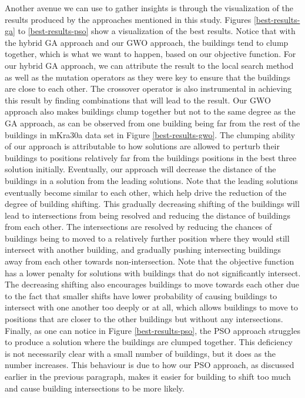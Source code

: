 Another avenue we can use to gather insights is through the visualization of the results produced by the approaches mentioned in this study. Figures \ref{best-results-ga} to \ref{best-results-pso} show a visualization of the best results. Notice that with the hybrid GA approach and our GWO approach, the buildings tend to clump together, which is what we want to happen, based on our objective function. For our hybrid GA approach, we can attribute the result to the local search method as well as the mutation operators as they were key to ensure that the buildings are close to each other. The crossover operator is also instrumental in achieving this result by finding combinations that will lead to the result. Our GWO approach also makes buildings clump together but not to the same degree as the GA approach, as can be observed from one building being far from the rest of the buildings in mKra30a data set in Figure \ref{best-results-gwo}. The clumping ability of our approach is attributable to how solutions are allowed to perturb their buildings to positions relatively far from the buildings positions in the best three solution initially. Eventually, our approach will decrease the distance of the buildings in a solution from the leading solutions. Note that the leading solutions eventually become similar to each other, which help drive the reduction of the degree of building shifting. This gradually decreasing shifting of the buildings will lead to intersections from being resolved and reducing the distance of buildings from each other. The intersections are resolved by reducing the chances of buildings being to moved to a relatively further position where they would still intersect with another building, and gradually pushing intersecting buildings away from each other towards non-intersection. Note that the objective function has a lower penalty for solutions with buildings that do not significantly intersect. The decreasing shifting also encourages buildings to move towards each other due to the fact that smaller shifts have lower probability of causing buildings to intersect with one another too deeply or at all, which allows buildings to move to positions that are closer to the other buildings but without any intersections. Finally, as one can notice in Figure \ref{best-results-pso}, the PSO approach struggles to produce a solution where the buildings are clumped together. This deficiency is not necessarily clear with a small number of buildings, but it does as the number increases. This behaviour is due to how our PSO approach, as discussed earlier in the previous paragraph, makes it easier for building to shift too much and cause building intersections to be more likely.

